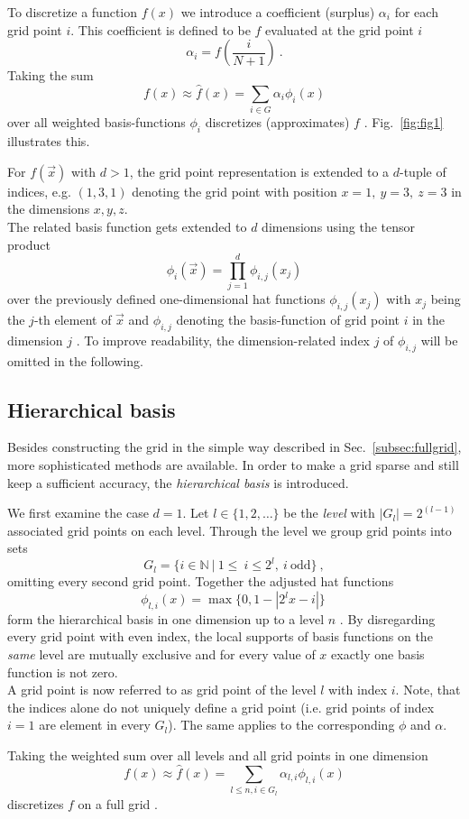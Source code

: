 \par

To discretize a function $f(x)$ we introduce a coefficient (surplus)
$\alpha_i$ for each grid point $i$. This coefficient is defined to be
$f$ evaluated at the grid point $i$
$$\alpha_i = f(\frac{i}{N+1}) \ .$$
Taking the sum
$$ f(x) \approx  \hat{f}(x) = \sum_{i \in G}{\alpha_i \phi_i(x)} $$
over all weighted basis-functions $\phi_i$ discretizes (approximates) $f$
\cite{disspfl}.
Fig.~\ref{fig:fig1} illustrates this.

\par

For $f(\vec{x})$ with $d > 1$, the grid point representation is extended to
a $d$-tuple of indices, e.g. $(1,3,1)$ denoting the grid point with position
$x = 1, \ y = 3, \ z = 3$ in the dimensions $x,y,z$. \\
The related basis function gets extended to $d$ dimensions using the tensor
product
$$\phi_i(\vec{x}) = \prod_{j=1}^d{\phi_{i,j}(x_j)}$$
over the previously defined one-dimensional hat functions
$\phi_{i,j}(x_j)$ with $x_j$ being the $j$-th element of $\vec{x}$ and
$\phi_{i,j}$ denoting the basis-function of grid point $i$ in the dimension
$j$ \cite{disspfl}.
To improve readability, the dimension-related index $j$ of $\phi_{i,j}$
will be omitted in the following.

\subsection{Hierarchical basis}
Besides constructing the grid in the simple way described in Sec.~\ref{subsec:fullgrid},
more sophisticated methods are available. In order to make a grid
sparse and still keep a sufficient accuracy, the
\emph{hierarchical basis} is introduced.
\par
We first examine the case $d = 1$.
Let $l \in \{1,2,\dots\}$ be the \emph{level} with $|G_l| = 2^{(l-1)}$ associated
grid points on each level. Through the level we group grid points
into sets
$$G_l = \{i \in \mathbb{N} \ | \ 1 \leq \ i \leq 2^l, \ i \ \text{odd}\} \ ,$$
omitting every second grid point. Together the adjusted hat functions
$$\phi_{l,i}(x) = \max\{0, 1 - |2^lx - i|\} \ $$
form the hierarchical basis in one dimension up to a level $n$
\cite{disspfl}.
By disregarding every
grid point with even index, the local supports of basis functions on the \emph{same}
level are mutually exclusive and for every value of $x$ exactly one basis
function is not zero. \\
A grid point is now referred to as grid point of the level $l$ with index $i$.
Note, that the indices alone do not uniquely define a grid point (i.e. grid
points of index $i = 1$ are element in every $G_l$). The same applies to
the corresponding $\phi$ and $\alpha$.
\par
Taking the weighted sum over all levels and all grid points in one dimension
$$ f(x) \approx \hat{f}(x) =  \sum_{l \leq n, i \in G_l}{\alpha_{l,i}\phi_{l,i}(x)}$$
discretizes $f$ on a full grid \cite{disspfl}.

